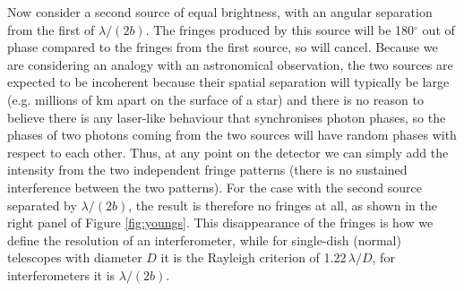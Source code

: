 \documentclass[11pt]{article}
\begin{document}
Now consider a second source of equal brightness, with an angular separation from the first of $\lambda/(2b)$. The fringes produced by this source will be 180$^\circ$ out of phase compared to the fringes from the first source, so will cancel. Because we are considering an analogy with an astronomical observation, the two sources are expected to be incoherent because their spatial separation will typically be large (e.g. millions of km apart on the surface of a star) and there is no reason to believe there is any laser-like behaviour that synchronises photon phases, so the phases of two photons coming from the two sources will have random phases with respect to each other. Thus, at any point on the detector we can simply add the intensity from the two independent fringe patterns (there is no sustained interference between the two patterns). For the case with the second source separated by $\lambda/(2b)$, the result is therefore no fringes at all, as shown in the right panel of Figure \ref{fig:youngs}. This disappearance of the fringes is how we define the resolution of an interferometer, while for single-dish (normal) telescopes with diameter $D$ it is the Rayleigh criterion of 1.22\,$\lambda/D$, for interferometers it is $\lambda/(2b)$.
\end{document}
